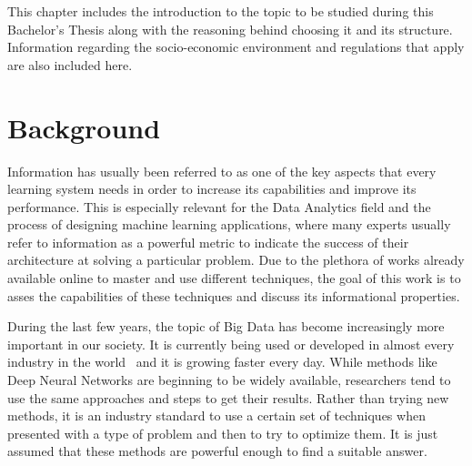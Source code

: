 This chapter includes the introduction to the topic to be studied during this Bachelor's Thesis along with the reasoning behind choosing it and its structure. Information regarding the socio-economic environment and regulations that apply are also included here.

\section{Background}
Information has usually been referred to as one of the key aspects that every learning system needs in order to increase its capabilities and improve its performance. This is especially relevant for the Data Analytics field and the process of designing machine learning applications, where many experts usually refer to information as a powerful metric to indicate the success of their architecture at solving a particular problem. Due to the plethora of works already available online to master and use different techniques, the goal of this work is to asses the capabilities of these techniques and discuss its informational properties. 


During the last few years, the topic of Big Data has become increasingly more important in our society. It is currently being used or developed in almost every industry in the world~\cite{article_Big_Data} and it is growing faster every day. While methods like Deep Neural Networks are beginning to be  widely available,  researchers tend to use the same approaches and steps to get their results. Rather than trying new methods, it is an industry standard to use a certain set of techniques when presented with a type of problem and then to try to optimize them. It is just assumed that these methods are powerful enough to find a suitable answer. 


